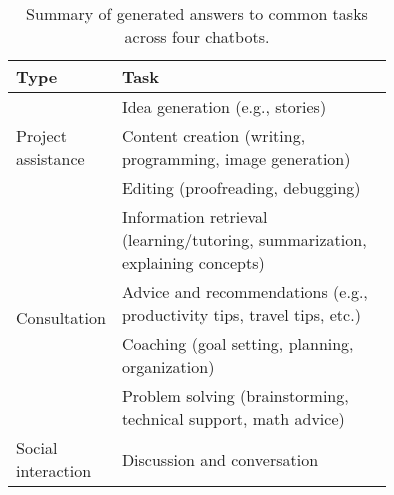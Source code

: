

\begin{table*}
  \begin{tabularx}{\textwidth}{l| p{0.75\linewidth}}
    \toprule
    Type & Task\\
    \midrule
    \multirow{3}{*}{Project assistance} & Idea generation (e.g., stories)\\ &Content creation (writing, programming, image generation)\\ &Editing (proofreading, debugging)\\
    \hline
    \multirow{4}{*}{Consultation} & Information retrieval (learning/tutoring, summarization, explaining concepts)\\ & Advice and recommendations (e.g., productivity tips, travel tips, etc.)\\ & Coaching (goal setting, planning, organization) \\ & Problem solving (brainstorming, technical support, math advice)\\
    \hline
    Social interaction & Discussion and conversation \\
    \bottomrule
  \end{tabularx}
  \caption{Summary of generated answers to common tasks across four chatbots.}
  \label{tasks}
\end{table*}


